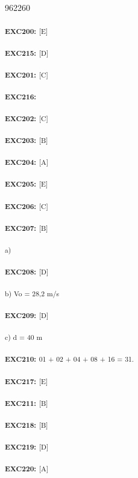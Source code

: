 \begin{questao}{962260}
{\textsubscript{\textbf{EXC200:}} \textsubscript{[E] }

\textsubscript{\textbf{EXC215:}} \textsubscript{[D] }

\textsubscript{\textbf{EXC201:}} \textsubscript{[C] }

\textsubscript{\textbf{EXC216: }}

\textsubscript{\textbf{EXC202:}} \textsubscript{[C] }


\textsubscript{\textbf{EXC203:}} \textsubscript{[B] }

\textsubscript{\textbf{EXC204:}} \textsubscript{[A] }

\textsubscript{\textbf{EXC205:}} \textsubscript{[E] }

\textsubscript{\textbf{EXC206:}} \textsubscript{[C] }

\textsubscript{\textbf{EXC207:}} \textsubscript{[B] }

\textsubscript{a) }

\textsubscript{\textbf{EXC208:}} \textsubscript{[D] }

\textsubscript{ b) Vo = 28,2 m/s }

\textsubscript{\textbf{EXC209:}} \textsubscript{[D] }

\textsubscript{ c) d = 40 m }

\textsubscript{\textbf{EXC210:}} \textsubscript{01 + 02 + 04 + 08 + 16 = 31. }

\textsubscript{\textbf{EXC217:}} \textsubscript{[E] }

\textsubscript{\textbf{EXC211:}} \textsubscript{[B] }

\textsubscript{\textbf{EXC218:}} \textsubscript{[B] }

\textsubscript{\textbf{EXC219:}} \textsubscript{[D] }

\textsubscript{\textbf{EXC220:}} \textsubscript{[A]}
  }

\end{questao}

